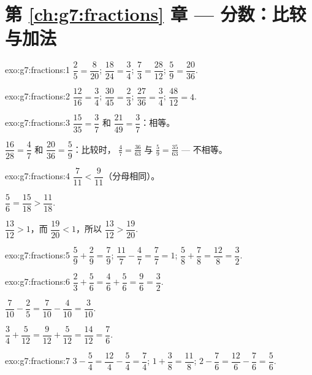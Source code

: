\section*{第 \ref{ch:g7:fractions} 章 --- 分数：比较与加法}

\begin{solution}{exo:g7:fractions:1}
$\dfrac{2}{5} = \dfrac{8}{20}$; \quad
$\dfrac{18}{24} = \dfrac{3}{4}$; \quad
$\dfrac{7}{3} = \dfrac{28}{12}$; \quad
$\dfrac{5}{9} = \dfrac{20}{36}$.
\end{solution}

\begin{solution}{exo:g7:fractions:2}
$\dfrac{12}{16} = \dfrac34$; \quad
$\dfrac{30}{45} = \dfrac23$; \quad
$\dfrac{27}{36} = \dfrac34$; \quad
$\dfrac{48}{12} = 4$.
\end{solution}

\begin{solution}{exo:g7:fractions:3}
$\dfrac{15}{35} = \dfrac37$ 和 $\dfrac{21}{49} = \dfrac37$：相等。

$\dfrac{16}{28} = \dfrac47$ 和 $\dfrac{20}{36} = \dfrac59$：比较时，
$\frac47 = \frac{36}{63}$ 与 $\frac59 = \frac{35}{63}$ ---
不相等。
\end{solution}

\begin{solution}{exo:g7:fractions:4}
$\dfrac{7}{11} < \dfrac{9}{11}$（分母相同）。

$\dfrac56 = \dfrac{15}{18} > \dfrac{11}{18}$.

$\dfrac{13}{12} > 1$，而 $\dfrac{19}{20} < 1$，所以
$\dfrac{13}{12} > \dfrac{19}{20}$.
\end{solution}

\begin{solution}{exo:g7:fractions:5}
$\dfrac59 + \dfrac29 = \dfrac79$; \quad
$\dfrac{11}{7} - \dfrac47 = \dfrac77 = 1$; \quad
$\dfrac58 + \dfrac78 = \dfrac{12}{8} = \dfrac32$.
\end{solution}

\begin{solution}{exo:g7:fractions:6}
$\dfrac23 + \dfrac56 = \dfrac46 + \dfrac56 = \dfrac96 = \dfrac32$.

$\dfrac{7}{10} - \dfrac25 = \dfrac{7}{10} - \dfrac{4}{10} =
\dfrac{3}{10}$.

$\dfrac34 + \dfrac{5}{12} = \dfrac{9}{12} + \dfrac{5}{12} =
\dfrac{14}{12} = \dfrac76$.
\end{solution}

\begin{solution}{exo:g7:fractions:7}
$3 - \dfrac54 = \dfrac{12}{4} - \dfrac54 = \dfrac74$; \quad
$1 + \dfrac38 = \dfrac{11}{8}$; \quad
$2 - \dfrac76 = \dfrac{12}{6} - \dfrac76 = \dfrac56$.
\end{solution}

